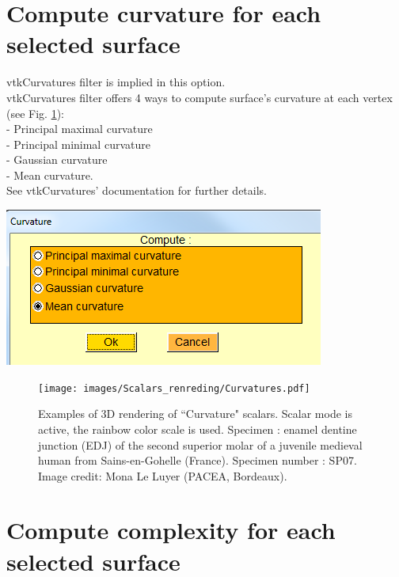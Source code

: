\section{Compute curvature for each selected surface}
\noindent
\begin{minipage}{0.5\textwidth}
vtkCurvatures filter is implied in this option.\\
vtkCurvatures filter offers 4 ways to compute surface's
curvature at each vertex (see Fig. \ref{curvatures}):\\
- Principal maximal curvature\\
- Principal minimal curvature\\
- Gaussian curvature\\
- Mean curvature.\\
See vtkCurvatures' documentation for further details.

\end{minipage}    
\begin{minipage}{0.5\textwidth}\centering
  \includegraphics[scale=0.5]{images/Scalars_renreding/Curvature_window.png}
\label{curvature_window}
 \end{minipage} 
\noindent

\begin{figure}
  \centering
  \texttt{[image: images/Scalars\_renreding/Curvatures.pdf]} 
	\caption{
Examples of 3D rendering of ``Curvature" scalars. Scalar mode is active, the rainbow color scale is used. Specimen : enamel dentine junction (EDJ) of the second superior molar of a juvenile medieval human from Sains-en-Gohelle (France). Specimen number : SP07. Image credit: Mona Le Luyer (PACEA, Bordeaux).}
\label{curvatures}
 
\end{figure}

\section{Compute complexity for each selected surface}



